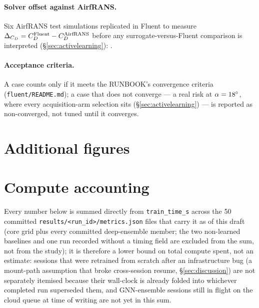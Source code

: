 \documentclass[11pt,a4paper]{article}
\begin{document}
\paragraph{Solver offset against AirfRANS.} Six AirfRANS test simulations
replicated in Fluent to measure $\Delta_{C_D} = C_D^{\text{Fluent}} -
C_D^{\text{AirfRANS}}$ before any surrogate-versus-Fluent comparison is
interpreted (\S\ref{sec:activelearning}): .

\paragraph{Acceptance criteria.} A case counts only if it meets the RUNBOOK's
convergence criteria (\texttt{fluent/README.md}); a case that does not
converge --- a real risk at $\alpha=18^{\circ}$, where every acquisition-arm
selection sits (\S\ref{sec:activelearning}) --- is reported as non-converged,
not tuned until it converges.

\section{Additional figures}
\label{app:figures}

\section{Compute accounting}
\label{app:compute}
Every number below is summed directly from \texttt{train\_time\_s} across the
50 committed \texttt{results/<run\_id>/metrics.json} files that carry it as of
this draft (core grid plus every committed deep-ensemble member; the two
non-learned baselines and one run recorded without a timing field are
excluded from the sum, not from the study); it is therefore a lower bound on
total compute spent, not an estimate: sessions that
were retrained from scratch after an infrastructure bug (a mount-path
assumption that broke cross-session resume, \S\ref{sec:discussion}) are not
separately itemised because their wall-clock is already folded into whichever
completed run superseded them, and GNN-ensemble sessions still in flight on
the cloud queue at time of writing are not yet in this sum.
\end{document}
